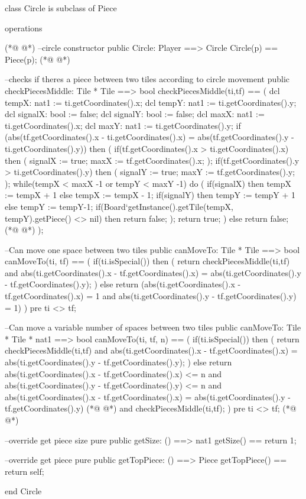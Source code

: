 \begin{vdmpp}[breaklines=true]
class Circle is subclass of Piece

operations
  
(*@
\label{Circle:5}
@*)
  --circle constructor
  public Circle: Player ==> Circle
  Circle(p) == Piece(p);
(*@
\label{checkPiecesMiddle:8}
@*)

  --checks if theres a piece between two tiles according to circle movement
  public checkPiecesMiddle: Tile * Tile ==> bool
  checkPiecesMiddle(ti,tf) == (
    dcl tempX: nat1 := ti.getCoordinates().x;
    dcl tempY: nat1 := ti.getCoordinates().y;
    dcl signalX: bool := false;
    dcl signalY: bool := false;
    dcl maxX: nat1 := ti.getCoordinates().x;
    dcl maxY: nat1 := ti.getCoordinates().y;
    if (abs(tf.getCoordinates().x - ti.getCoordinates().x) = abs(tf.getCoordinates().y - ti.getCoordinates().y)) then (
     if(tf.getCoordinates().x > ti.getCoordinates().x)
      then (
       signalX := true;
       maxX := tf.getCoordinates().x;
      );
     if(tf.getCoordinates().y > ti.getCoordinates().y)
      then (
       signalY := true;
       maxY := tf.getCoordinates().y;
      );
     while(tempX < maxX -1 or tempY < maxY -1)
       do (
         if(signalX)
          then tempX := tempX + 1
         else tempX := tempX - 1;
         if(signalY)
          then tempY := tempY + 1
         else
          tempY := tempY-1;
         if(Board`getInstance().getTile(tempX, tempY).getPiece() <> nil)
          then return false;
         );
     return true;
    )
    else return false;
(*@
\label{canMoveTo:44}
@*)
  );
  
  --Can move one space between two tiles
  public canMoveTo: Tile * Tile ==> bool
  canMoveTo(ti, tf) == (
   if(ti.isSpecial())
    then (
     return checkPiecesMiddle(ti,tf) and
         abs(ti.getCoordinates().x - tf.getCoordinates().x) = abs(ti.getCoordinates().y - tf.getCoordinates().y);
    )
   else return (abs(ti.getCoordinates().x - tf.getCoordinates().x) = 1 and
        abs(ti.getCoordinates().y - tf.getCoordinates().y) = 1)
  )
  pre ti <> tf;
  
  --Can move a variable number of spaces between two tiles
  public canMoveTo: Tile * Tile * nat1 ==> bool
  canMoveTo(ti, tf, n) == (
    if(ti.isSpecial())
     then (
      return checkPiecesMiddle(ti,tf) and
          abs(ti.getCoordinates().x - tf.getCoordinates().x) = abs(ti.getCoordinates().y - tf.getCoordinates().y);
     )
    else return abs(ti.getCoordinates().x - tf.getCoordinates().x) <= n and
          abs(ti.getCoordinates().y - tf.getCoordinates().y) <= n and
          abs(ti.getCoordinates().x - tf.getCoordinates().x) = abs(ti.getCoordinates().y - tf.getCoordinates().y)
(*@
\label{getSize:70}
@*)
           and checkPiecesMiddle(ti,tf);
  )
  pre ti <> tf;
(*@
\label{getTopPiece:73}
@*)
  
  --override get piece size
  pure public getSize: () ==> nat1
  getSize() == return 1;
  
  --override get piece
  pure public getTopPiece: () ==> Piece
  getTopPiece() == return self;
  
end Circle
\end{vdmpp}
